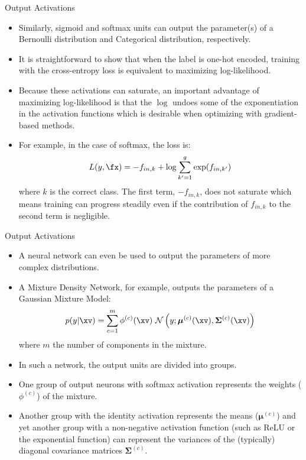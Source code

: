 \begin{frame} {Output Activations}
  \begin{itemize}
    \item Similarly, sigmoid and softmax units can output the parameter(s) of a Bernoulli distribution and Categorical distribution, respectively.
    \item It is straightforward to show that when the label is one-hot encoded, training with the cross-entropy loss is equivalent to maximizing log-likelihood. \href{https://www.quora.com/What-are-the-differences-between-maximum-likelihood-and-cross-entropy-as-a-loss-function}{}

    \item Because these activations can saturate, an important advantage of maximizing log-likelihood is that the $\log$ undoes some of the exponentiation in the activation functions which is desirable when optimizing with gradient-based methods.
    \item For example, in the case of softmax, the loss is:
    $$ L(y, \fx) = - f_{in,k} + \log {\sum_{k'=1}^g\exp(f_{in,k'})}$$ where $k$ is the correct class. The first term, $- f_{in,k}$, does not saturate which means training can progress steadily even if the contribution of $f_{in,k}$ to the second term is negligible.
  \end{itemize}
\end{frame}

\begin{frame} {Output Activations}
  \begin{itemize}
    \item A neural network can even be used to output the parameters of more complex distributions.
    \item A Mixture Density Network, for example, outputs the parameters of a Gaussian Mixture Model:
$$p(y | \xv)=\sum_{c=1}^{m} \phi^{(c)} (\xv) ~ \mathcal{N}\left(y ; \boldsymbol{\mu}^{(c)}(\xv), \boldsymbol{\Sigma}^{(c)}(\xv)\right)$$
          where $m$ the number of components in the mixture.
    \item In such a network, the output units are divided into groups.
    \item One group of output neurons with softmax activation represents the weights ($\phi^{(c)}$) of the mixture.
    \item Another group with the identity activation represents the means ($\boldsymbol{\mu}^{(c)}$) and yet another group with a non-negative activation function (such as ReLU or the exponential function) can represent the variances of the (typically) diagonal covariance matrices $\boldsymbol{\Sigma}^{(c)}$.
  \end{itemize}
\end{frame}

